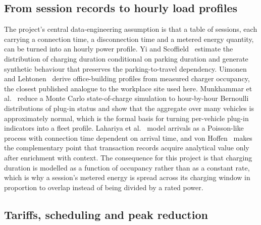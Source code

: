 \documentclass[10pt,a4paper]{article}
\begin{document}
\subsection{From session records to hourly load profiles}

The project's central data-engineering assumption is that a table of sessions, each carrying a
connection time, a disconnection time and a metered energy quantity, can be turned into an hourly
power profile. Yi and Scoffield~\cite{Yi2018ResidentialLoadProfileGeneration} estimate the
distribution of charging duration conditional on parking duration and generate synthetic behaviour
that preserves the parking-to-travel dependency. Uimonen and
Lehtonen~\cite{Uimonen2020OfficeBuildingOccupancy} derive office-building profiles from measured
charger occupancy, the closest published analogue to the workplace site used here.
Munkhammar et al.~\cite{Munkhammar2014BernoulliPEVCharging} reduce a Monte Carlo state-of-charge
simulation to hour-by-hour Bernoulli distributions of plug-in status and show that the aggregate
over many vehicles is approximately normal, which is the formal basis for turning per-vehicle
plug-in indicators into a fleet profile. Lahariya et
al.~\cite{Lahariya2020SyntheticDataGenerator} model arrivals as a Poisson-like process with
connection time dependent on arrival time, and von
Hoffen~\cite{vonHoffen2016ChargingTransactionAnalytics} makes the complementary point that
transaction records acquire analytical value only after enrichment with context. The consequence
for this project is that charging duration is modelled as a function of occupancy rather than as a
constant rate, which is why a session's metered energy is spread across its charging window in
proportion to overlap instead of being divided by a rated power.

\subsection{Tariffs, scheduling and peak reduction}
\end{document}
